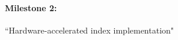 \documentclass[11pt,letterpaper]{article}
\begin{document}
\paragraph{Milestone 2:} ``Hardware-accelerated index implementation"





\end{document}
